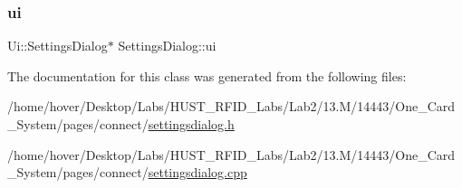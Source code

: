 \subsubsection{\texorpdfstring{ui}{ui}}
{\footnotesize\ttfamily Ui\+::\+Settings\+Dialog$\ast$ Settings\+Dialog\+::ui\hspace{0.3cm}{\ttfamily [private]}}



The documentation for this class was generated from the following files\+:\begin{DoxyCompactItemize}
\item 
/home/hover/\+Desktop/\+Labs/\+H\+U\+S\+T\+\_\+\+R\+F\+I\+D\+\_\+\+Labs/\+Lab2/13.\+M/14443/\+One\+\_\+\+Card\+\_\+\+System/pages/connect/\mbox{\hyperlink{settingsdialog_8h}{settingsdialog.\+h}}\item 
/home/hover/\+Desktop/\+Labs/\+H\+U\+S\+T\+\_\+\+R\+F\+I\+D\+\_\+\+Labs/\+Lab2/13.\+M/14443/\+One\+\_\+\+Card\+\_\+\+System/pages/connect/\mbox{\hyperlink{settingsdialog_8cpp}{settingsdialog.\+cpp}}\end{DoxyCompactItemize}
